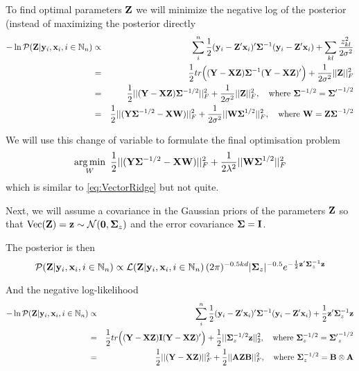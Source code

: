 To find optimal parameters $\mathbf{Z}$ we will minimize the negative log of the posterior (instead of maximizing the posterior directly
\begin{eqnarray*}
- \ln \mathcal{P}(\mathbf{Z}|\mathbf{y}_i,\mathbf{x}_i, i \in \mathbb{N}_n) & \propto & \sum_i^n \frac{1}{2} (\mathbf{y}_i - \mathbf{Z}' \mathbf{x}_i)' \mathbf{\Sigma}^{-1} (\mathbf{y}_i - \mathbf{Z}' \mathbf{x}_i) + \sum_{kl} \frac{z_{kl}^2}{2\sigma^2} \nonumber \\
& = & \frac{1}{2} tr \Big( (\mathbf{Y}-\mathbf{XZ}) \mathbf{\Sigma}^{-1} (\mathbf{Y}-\mathbf{XZ})' \Big) + \frac{1}{2\sigma^2} ||\mathbf{Z}||_F^2 \nonumber \\
& = & \frac{1}{2} || (\mathbf{Y}-\mathbf{XZ}) \mathbf{\Sigma}^{-1/2}||_F^2 + \frac{1}{2\sigma^2} ||\mathbf{Z}||_F^2, \quad \text{where } \mathbf{\Sigma}^{-1/2} = \mathbf{\Sigma'}^{-1/2} \nonumber \\
& = & \frac{1}{2} || (\mathbf{Y}\mathbf{\Sigma}^{-1/2}-\mathbf{XW})||_F^2 + \frac{1}{2\sigma^2} ||\mathbf{W\Sigma}^{1/2}||_F^2, \quad \text{where } \mathbf{W} = \mathbf{Z\Sigma}^{-1/2}
\end{eqnarray*}

We will use this change of variable to formulate the final optimisation problem
\begin{equation}\label{eq:MAP}
\operatorname*{arg\,min}_W \ \frac{1}{2} || (\mathbf{Y}\mathbf{\Sigma}^{-1/2}-\mathbf{XW})||_F^2 + \frac{1}{2\lambda^2} ||\mathbf{W\Sigma}^{1/2}||_F^2
\end{equation}
which is similar to \eqref{eq:VectorRidge} but not quite.

Next, we will assume a covariance in the Gaussian priors of the parameters $\mathbf{Z}$ so that $\operatorname*{Vec}(\mathbf{Z}) = \mathbf{z} \sim \mathcal{N}(\mathbf{0},\mathbf{\Sigma}_z)$ and the error covariance $\mathbf{\Sigma} = \mathbf{I}$.

The posterior is then
\begin{equation}
\mathcal{P}(\mathbf{Z}|\mathbf{y}_i,\mathbf{x}_i, i \in \mathbb{N}_n) \propto \mathcal{L}(\mathbf{Z}|\mathbf{y}_i,\mathbf{x}_i, i \in \mathbb{N}_n) \,
(2\pi)^{-0.5kd} |\mathbf{\Sigma}_z|^{-0.5} e^{-\frac{1}{2} \mathbf{z}' \mathbf{\Sigma}_z^{-1} \mathbf{z}}
\end{equation}

And the negative log-likelihood
\begin{eqnarray*}
- \ln \mathcal{P}(\mathbf{Z}|\mathbf{y}_i,\mathbf{x}_i, i \in \mathbb{N}_n) & \propto & \sum_i^n \frac{1}{2} (\mathbf{y}_i - \mathbf{Z}' \mathbf{x}_i)' \mathbf{\Sigma}^{-1} (\mathbf{y}_i - \mathbf{Z}' \mathbf{x}_i) + \frac{1}{2} \mathbf{z}' \mathbf{\Sigma}_z^{-1} \mathbf{z} \nonumber \\
& = & \frac{1}{2} tr \Big( (\mathbf{Y}-\mathbf{XZ}) \mathbf{I} (\mathbf{Y}-\mathbf{XZ})' \Big) + \frac{1}{2} ||\mathbf{\Sigma}_z^{-1/2} \mathbf{z}||_2^2, \quad \text{where } \mathbf{\Sigma}_z^{-1/2} = \mathbf{\Sigma'}_z^{-1/2}  \nonumber \\
& = & \frac{1}{2} || (\mathbf{Y}-\mathbf{XZ})||_F^2 + \frac{1}{2} ||\mathbf{AZB}||_F^2, \quad \text{where } \mathbf{\Sigma}_z^{-1/2} = \mathbf{B} \otimes \mathbf{A}  \nonumber \\
\end{eqnarray*}

